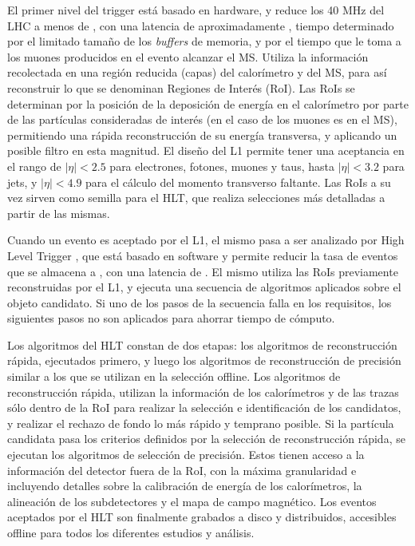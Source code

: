 El primer nivel del trigger \cite{Achenbach:2008zzb} está basado en hardware, y reduce los 40 MHz del LHC a menos de , con una latencia de aproximadamente , tiempo determinado por el limitado tamaño de los \textit{buffers} de memoria, y por el tiempo que le toma a los muones producidos en el evento alcanzar el MS. Utiliza la información recolectada en una región reducida (capas) del calorímetro y del MS, para así reconstruir lo que se denominan Regiones de Interés (RoI). Las RoIs se determinan por la posición de la deposición de energía en el calorímetro por parte de las partículas consideradas de interés (en el caso de los muones es en el MS), permitiendo una rápida reconstrucción de su energía transversa, y aplicando un posible filtro en esta magnitud. El diseño del L1 permite tener una aceptancia en el rango de $|\eta|<2.5$ para electrones, fotones, muones y taus, hasta $|\eta|<3.2$ para jets, y $|\eta|<4.9$ para el cálculo del momento transverso faltante. Las RoIs a su vez sirven como semilla para el HLT, que realiza selecciones más detalladas a partir de las mismas.



Cuando un evento es aceptado por el L1, el mismo pasa a ser analizado por High Level Trigger \cite{ATLAS-TDR-16}, que está basado en software y permite reducir la tasa de eventos que se almacena a , con una latencia de . El mismo utiliza las RoIs previamente reconstruidas por el L1, y ejecuta una secuencia de algoritmos aplicados sobre el objeto candidato. Si uno de los pasos de la secuencia falla en los requisitos, los siguientes pasos no son aplicados para ahorrar tiempo de cómputo. 


Los algoritmos del HLT constan de dos etapas: los algoritmos de reconstrucción rápida, ejecutados primero, y luego los algoritmos de reconstrucción de precisión similar a los que se utilizan en la selección offline. Los algoritmos de reconstrucción rápida, utilizan la información de los calorímetros y de las trazas sólo dentro de la RoI para realizar la selección e identificación de los candidatos, y realizar el rechazo de fondo lo más rápido y temprano posible. Si la partícula candidata pasa los criterios definidos por la selección de reconstrucción rápida, se ejecutan los algoritmos de selección de precisión. Estos tienen acceso a la información del detector fuera de la RoI, con la máxima granularidad e incluyendo detalles sobre la calibración de energía de los calorímetros, la alineación de los subdetectores y el mapa de campo magnético. Los eventos aceptados por el HLT son finalmente grabados a disco y distribuidos, accesibles offline para todos los diferentes estudios y análisis.




